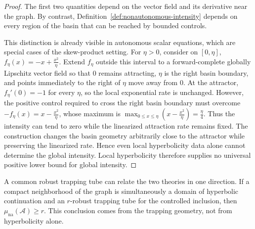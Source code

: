 \documentclass[pdflatex,sn-mathphys-num]{sn-jnl}
\numberwithin{equation}{section}
\theoremstyle{thmstyleone}%
\theoremstyle{definition}
\theoremstyle{remark}
\begin{document}
\begin{proof}
The first two quantities depend on the vector field and its derivative near the graph. By contrast, Definition~\ref{def:nonautonomous-intensity} depends on every region of the basin that can be reached by bounded controls.

This distinction is already visible in autonomous scalar equations, which are special cases of the skew-product setting. For $\eta>0$, consider on $[0,\eta]$, $f_\eta(x) = -x+\frac{x^2}{\eta}$. Extend $f_\eta$ outside this interval to a forward-complete globally Lipschitz vector field so that $0$ remains attracting, $\eta$ is the right basin boundary, and points immediately to the right of $\eta$ move away from $0$. At the attractor, $f_\eta'(0)=-1$ for every $\eta$, so the local exponential rate is unchanged. However, the positive control required to cross the right basin boundary must overcome
    $-f_\eta(x)
    =
    x-\frac{x^2}{\eta}$,
whose maximum is
    $\max_{0\leq x\leq\eta}
    \left(
        x-\frac{x^2}{\eta}
    \right)
    =
    \frac{\eta}{4}$.
Thus the intensity can tend to zero while the linearized attraction rate remains fixed. The construction changes the basin geometry arbitrarily close to the attractor while preserving the linearized rate. Hence even local hyperbolicity data alone cannot determine the global intensity. Local hyperbolicity therefore supplies no universal positive lower bound for global intensity.
\end{proof}

A common robust trapping tube can relate the two theories in one direction. If a compact neighborhood of the graph is simultaneously a domain of hyperbolic continuation and an $r$-robust trapping tube for the controlled inclusion, then $\mu_{\mathrm{na}}(\mathcal A)\geq r$. This conclusion comes from the trapping geometry, not from hyperbolicity alone.
\end{document}
